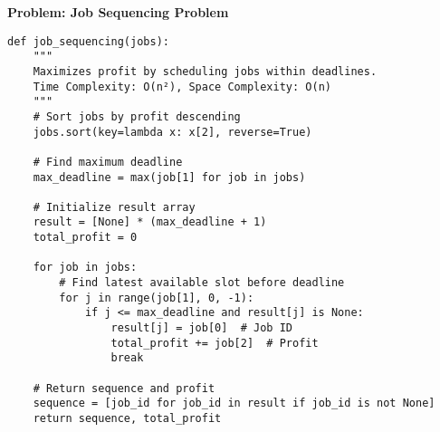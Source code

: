 \noindent\textbf{Problem: Job Sequencing Problem}
\begin{verbatim}
def job_sequencing(jobs):
    """
    Maximizes profit by scheduling jobs within deadlines.
    Time Complexity: O(n²), Space Complexity: O(n)
    """
    # Sort jobs by profit descending
    jobs.sort(key=lambda x: x[2], reverse=True)
    
    # Find maximum deadline
    max_deadline = max(job[1] for job in jobs)
    
    # Initialize result array
    result = [None] * (max_deadline + 1)
    total_profit = 0
    
    for job in jobs:
        # Find latest available slot before deadline
        for j in range(job[1], 0, -1):
            if j <= max_deadline and result[j] is None:
                result[j] = job[0]  # Job ID
                total_profit += job[2]  # Profit
                break
    
    # Return sequence and profit
    sequence = [job_id for job_id in result if job_id is not None]
    return sequence, total_profit
\end{verbatim}

